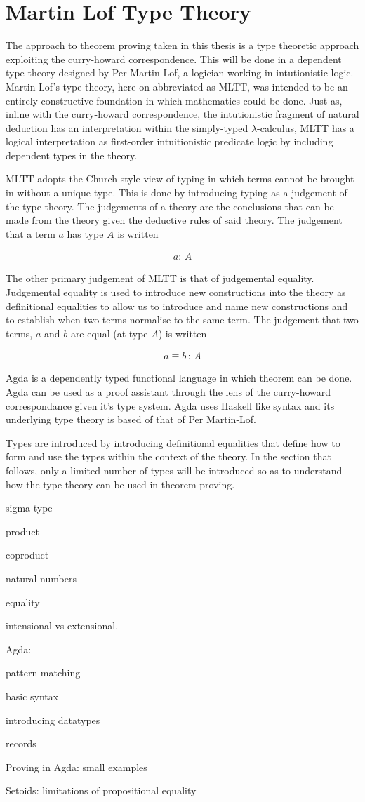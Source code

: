 \section{Martin Lof Type Theory}
The approach to theorem proving taken in this thesis is a type theoretic
approach exploiting the curry-howard correspondence. This will be done in a
dependent type theory designed by Per Martin Lof, a logician working in
intutionistic logic. Martin Lof's type theory, here on abbreviated as MLTT, was
intended to be an entirely constructive foundation in which mathematics could be
done. Just as, inline with the curry-howard correspondence, the intutionistic
fragment of natural deduction has an interpretation within the simply-typed
$\lambda$-calculus, MLTT has a logical interpretation as first-order
intuitionistic predicate logic by including dependent types in the theory.

MLTT adopts the Church-style view of typing in which terms cannot be brought in
without a unique type. This is done by introducing typing as a judgement of the
type theory. The judgements of a theory are the conclusions that can be made
from the theory given the deductive rules of said theory. The judgement that a
term $a$ has type $A$ is written

\begin{align*}
    a: \, A
\end{align*}

The other primary judgement of MLTT is that of judgemental equality. Judgemental
equality is used to introduce new constructions into the theory as definitional
equalities to allow us to introduce and name new constructions and to establish
when two terms normalise to the same term. The judgement that two terms,
$a$ and $b$ are equal (at type $A$) is written

\begin{align*}
    a \equiv b \, : \, A
\end{align*}


Agda is a dependently typed functional language in which theorem can be done.
Agda can be used as a proof assistant through the lens of the curry-howard
correspondance given it's type system. Agda uses Haskell like syntax and its
underlying type theory is based of that of Per Martin-Lof.

Types are introduced by introducing definitional equalities that define how to
form and use the types within the context of the theory. In the section that
follows, only a limited number of types will be introduced so as to understand
how the type theory can be used in theorem proving.

sigma type

product

coproduct

natural numbers

equality

intensional vs extensional.

Agda:

pattern matching

basic syntax

introducing datatypes

records



Proving in Agda: small examples

Setoids: limitations of propositional equality
